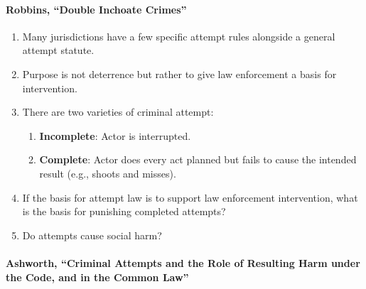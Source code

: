 \paragraph{Robbins, ``Double Inchoate Crimes''}

\begin{enumerate}
    \item Many jurisdictions have a few specific attempt rules alongside a 
    general attempt statute.
    \item Purpose is not deterrence but rather to give law enforcement a basis 
    for intervention.
    \item There are two varieties of criminal attempt:
    \begin{enumerate}
        \item \textbf{Incomplete}: Actor is interrupted.
        \item \textbf{Complete}: Actor does every act planned but fails to 
        cause the intended result (e.g., shoots and misses).
    \end{enumerate}
    \item If the basis for attempt law is to support law enforcement 
    intervention, what is the basis for punishing completed attempts?
    \item Do attempts cause social harm?
\end{enumerate}

\paragraph{Ashworth, ``Criminal Attempts and the Role of Resulting Harm under 
the Code, and in the Common Law''}

